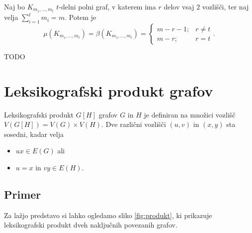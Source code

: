 \documentclass[mat1, tisk]{fmfdelo}
\newcommand{\1}{(1, 1, \ldots, 1)}
\newcommand{\2}{(2, 2, \ldots, 2)}
\begin{document}
\begin{trditev}
    Naj bo $K_{m_1, \ldots, m_t}$ $t$-delni polni graf, v katerem ima $r$ delov vsaj $2$ vozlišči, 
    ter naj velja $\sum_{i=1}^{t} m_i = m.$ Potem je
    $$\mu(K_{m_1, \ldots, m_t}) = \beta(K_{m_1, \ldots, m_t}) = 
    \begin{cases}
        m - r - 1; & r \neq t \\
        m - r; & r = t 
    \end{cases}.$$
\end{trditev}

\begin{dokaz}
    TODO
\end{dokaz}





\section{Leksikografski produkt grafov}\label{s:leks_prod}


\begin{definicija} \label{def:leks_prod}
    Leksikografski produkt $G[H]$ grafov $G$ in $H$ je definiran na množici vozlišč 
    $V (G[H]) = V (G)\times V (H)$. Dve različni vozlišči $(u, v)$ in $(x, y)$ sta 
    sosedni, kadar velja
\begin{itemize}
    \item $ux \in E(G)$ ali
    \item $u = x$ in $vy \in E(H).$ 
\end{itemize}
\end{definicija}




\subsection{Primer} 
Za lažjo predstavo si lahko ogledamo sliko \ref{fig:produkt}, ki prikazuje leksikografski 
produkt dveh naključnih povezanih grafov.
\end{document}
